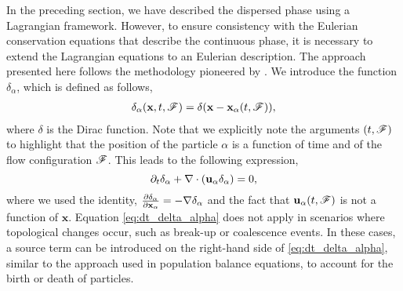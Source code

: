 In the preceding section, we have described the dispersed phase using a Lagrangian framework. 
However, to ensure consistency with the Eulerian conservation equations that describe the continuous phase, it is necessary to extend the Lagrangian equations to an Eulerian description. 
The approach presented here follows the methodology pioneered by \citep{lhuillier1992ensemble}.
 We introduce the function $\delta_\alpha$, which is defined as follows, 
\begin{align}
    \delta_\alpha(\textbf{x},t,\mathscr{F}) = \delta(\textbf{x}-\textbf{x}_\alpha(t,\mathscr{F})),
    \label{eq:delta_alpha}
\end{align}
where $\delta$ is the Dirac function.
Note that we explicitly note the arguments $(t,\mathscr{F})$ to highlight that the position of the particle $\alpha$ is a function of time and of the flow configuration $\mathscr{F}$.
This leads to the following expression, 
\begin{equation}
    \partial_t \delta_\alpha
    + \mathbf{\nabla}\cdot (\textbf{u}_\alpha  \delta_\alpha)
    =0,
    \label{eq:dt_delta_alpha}
\end{equation}
where we used the identity, $\frac{\partial \delta_\alpha}{\partial \textbf{x}_\alpha}  = -\mathbf{\nabla} \delta_\alpha$ and the fact that $\textbf{u}_\alpha(t,\mathscr{F})$ is not a function of $\textbf{x}$. 
Equation \ref{eq:dt_delta_alpha} does not apply in scenarios where topological changes occur, such as break-up or coalescence events. 
In these cases, a source term can be introduced on the right-hand side of \ref{eq:dt_delta_alpha}, similar to the approach used in population balance equations, to account for the birth or death of particles.

